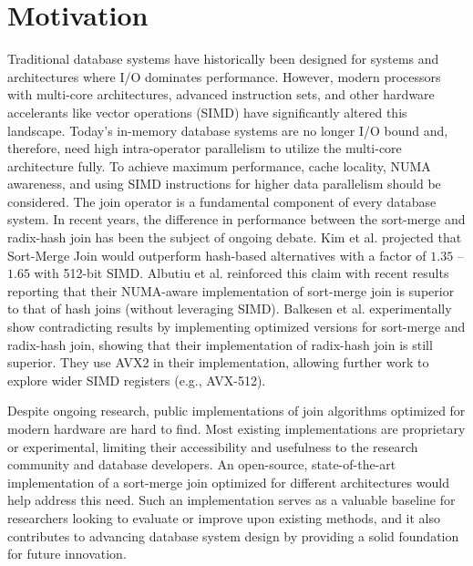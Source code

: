 \section{Motivation}
\label{sec:motivation}

Traditional database systems have historically been designed for systems and architectures where
I/O dominates performance. However, modern processors with multi-core architectures, advanced 
instruction sets, and other hardware accelerants like vector operations (SIMD) have significantly 
altered this landscape. Today's in-memory database systems are no longer I/O bound and, therefore,
need high intra-operator parallelism to utilize the multi-core architecture fully. To achieve
maximum performance, cache locality, NUMA awareness, and using SIMD instructions for higher data
parallelism should be considered.
The join operator is a fundamental component of every database system.
In recent years, the difference in performance between the sort-merge and radix-hash join has been
the subject of ongoing debate. Kim et al. \cite{10.14778/1687553.1687564} projected that Sort-Merge Join would outperform hash-based
alternatives with a factor of $1.35$ – $1.65$ with 512-bit SIMD. Albutiu et al. \cite{MPSM} reinforced this claim with recent results reporting that
their NUMA-aware implementation of sort-merge join is superior to that of hash joins (without
leveraging SIMD). Balkesen et al. \cite{Balkesen} experimentally show contradicting results by implementing 
optimized versions for sort-merge and radix-hash join, showing that their implementation of
radix-hash join is still superior. They use AVX2 in their implementation, allowing further
work to explore wider SIMD registers (e.g., AVX-512).

Despite ongoing research, public implementations of join algorithms optimized for modern hardware
are hard to find. Most existing implementations are proprietary or experimental, limiting their
accessibility and usefulness to the research community and database developers. An open-source,
state-of-the-art implementation of a sort-merge join optimized for different architectures would
help address this need. Such an implementation serves as a valuable baseline for researchers
looking to evaluate or improve upon existing methods, and it also contributes to advancing database
system design by providing a solid foundation for future innovation.



